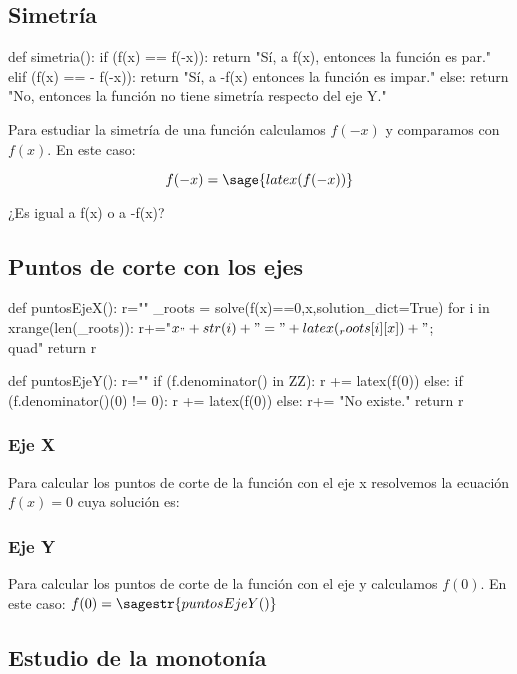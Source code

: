 
\subsection{Simetría}
\begin{sagesilent}
def simetria():
    if (f(x) == f(-x)):
        return "Sí, a f(x), entonces la función es par."
    elif (f(x) == - f(-x)):
        return "Sí, a -f(x) entonces la función es impar."
    else:
        return "No, entonces la función no tiene simetría respecto del eje Y."
\end{sagesilent}

Para estudiar la simetría de una función calculamos $f(-x)$ y comparamos con $f(x)$. 
%
En este caso:

\[f(-x) = \sage{latex(f(-x))}\]

¿Es igual a f(x) o a -f(x)? 

\subsection{Puntos de corte con los ejes}
\begin{sagesilent}
def puntosEjeX():
    r=""
    _roots = solve(f(x)==0,x,solution_dict=True)
    for i in xrange(len(_roots)):
        r+="$x_"+str(i)+" = "+latex(_roots[i][x])+"$;\\quad"
    return r

def puntosEjeY():
    r=""
    if (f.denominator() in ZZ):
        r += latex(f(0))
    else:
        if (f.denominator()(0) != 0):
            r += latex(f(0))   
        else:
            r+= "No existe."    
    return r

\end{sagesilent}

\subsubsection{Eje X}
Para calcular los puntos de corte de la función con el eje x resolvemos la ecuación $f(x) = 0$ cuya solución es: 

\subsubsection{Eje Y}
Para calcular los puntos de corte de la función con el eje y calculamos $f(0)$. 
%
En este caso: $f(0)=\sagestr{puntosEjeY()}$


\subsection{Estudio de la monotonía}

